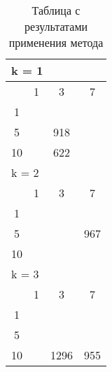 \begin{table}
  \centering
  \begin{tabular}{|*4{c|}}
    \hline
    \multicolumn{4}{|l|}{k = 1} \\
    \hline
    \diagbox{$\mu$}{$\lambda$} & \multicolumn{1}{c|}{1} & \multicolumn{1}{c|}{3} & \multicolumn{1}{c|}{7} \\
    \hline
    1 & \cellcolor{olive}{3631} & \cellcolor{olive}{1776} & \cellcolor{olive}{1226} \\
    \hline
    5 & \cellcolor{olive}{1666} & 918& \cellcolor{olive}{502} \\
    \hline
    10 & \cellcolor{olive}{1008} & 622& \cellcolor{olive}{358} \\
    \hline
    \multicolumn{4}{|l|}{k = 2} \\
    \hline
    \diagbox{$\mu$}{$\lambda$} & \multicolumn{1}{c|}{1} & \multicolumn{1}{c|}{3} & \multicolumn{1}{c|}{7} \\
    \hline
    1 & \cellcolor{olive}{4744}& \cellcolor{olive}{1839}& \cellcolor{olive}{1160} \\
    \hline
    5 & \cellcolor{olive}{2467}& \cellcolor{olive}{1128} & 967 \\
    \hline
    10 & \cellcolor{olive}{1722}& \cellcolor{olive}{988}& \cellcolor{olive}{615} \\
    \hline
    \multicolumn{4}{|l|}{k = 3} \\
    \hline
    \diagbox{$\mu$}{$\lambda$} & \multicolumn{1}{c|}{1} & \multicolumn{1}{c|}{3} & \multicolumn{1}{c|}{7} \\
    \hline
    1 & \cellcolor{olive}{5159}& \cellcolor{olive}{2821} & \cellcolor{olive}{1517} \\
    \hline
    5 & \cellcolor{olive}{2704} & \cellcolor{olive}{1544} & \cellcolor{olive}{902} \\
    \hline
    10 & \cellcolor{olive}{2048} & 1296 & 955 \\
  \hline
  \end{tabular}
  \captionsetup{justification=centering}
  \caption{Таблица с результатами применения метода }
\end{table}

